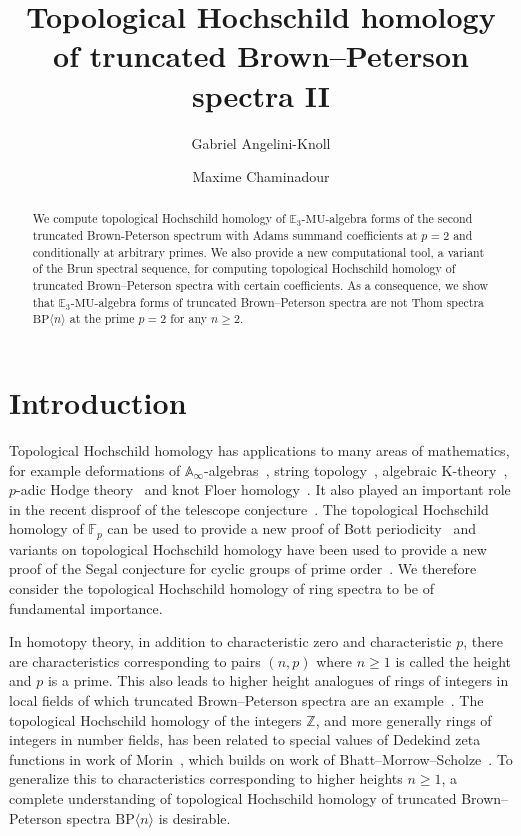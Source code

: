 \documentclass[11pt]{amsart}
\title[THH of truncated Brown--Peterson spectra II]{Topological Hochschild homology of truncated Brown--Peterson spectra II}
\author{Gabriel Angelini-Knoll}
\author{Maxime Chaminadour}
\newcommand{\mr}[1]{\mathrm{#1}}
\newcommand{\MU}{\mr{MU}}
\newcommand{\BP}{\mr{BP}}
\theoremstyle{definition}
\numberwithin{equation}{section}
\numberwithin{figure}{section}
\begin{document}
 
%
\begin{abstract}
We compute topological Hochschild homology of $\mathbb{E}_3$-$\MU$-algebra forms of the second truncated Brown-Peterson spectrum with Adams summand coefficients at $p=2$ and conditionally at arbitrary primes.  
We also provide a new computational tool, a variant of the Brun spectral sequence, for computing topological Hochschild homology of truncated Brown--Peterson spectra with certain coefficients. As a consequence, we show that $\mathbb{E}_3$-$\MU$-algebra forms of truncated Brown--Peterson spectra are not Thom spectra $\mathrm{BP}\langle n\rangle$ at the prime $p=2$ for any $n\ge 2$. 
\end{abstract}          \maketitle 
	\tableofcontents	
%

\section{Introduction}
Topological Hochschild homology has applications to many areas of mathematics, for example deformations of $\mathbb{A}_{\infty}$-algebras~\cite{Laz01}, string topology~\cite{CJ02}, algebraic K-theory~\cite{BHM93}, $p$-adic Hodge theory~\cite{BMS19}  and knot Floer homology~\cite{LOT15}. It also played an important role in the recent disproof of the telescope conjecture~\cite{BHLS23}. The topological Hochschild homology of $\mathbb{F}_p$ can be used to provide a new proof of Bott periodicity~\cite{HN20} and variants on topological Hochschild homology have been used to provide a new proof of the Segal conjecture for cyclic groups of prime order~\cites{HW21,AKZ25}. 
We therefore consider the topological Hochschild homology of ring spectra to be of fundamental importance. 

In homotopy theory, in addition to characteristic zero and characteristic $p$, there are characteristics corresponding to pairs $(n,p)$ where $n\ge 1$ is called the height and $p$ is a prime. This also leads to higher height analogues of rings of integers in local fields of which truncated Brown--Peterson spectra are an example~\cite{Rog25}. The topological Hochschild homology of the integers $\mathbb{Z}$, and more generally rings of integers in number fields, has been related to special values of Dedekind zeta functions in work of Morin~\cite{Mor24}, which builds on work of Bhatt--Morrow--Scholze~\cite{BMS19}. To generalize this to characteristics corresponding to higher heights $n\ge 1$, a complete understanding of topological Hochschild homology of truncated Brown--Peterson spectra $\BP\langle n\rangle$ is desirable.
\end{document}
